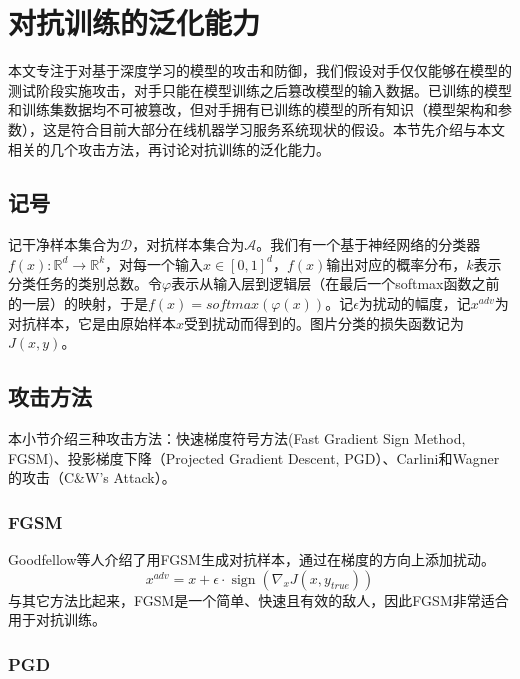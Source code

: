 \chapter{对抗训练的泛化能力}

本文专注于对基于深度学习的模型的攻击和防御，我们假设对手仅仅能够在模型的测试阶段实施攻击，对手只能在模型训练之后篡改模型的输入数据。已训练的模型和训练集数据均不可被篡改，但对手拥有已训练的模型的所有知识（模型架构和参数），这是符合目前大部分在线机器学习服务系统现状的假设。本节先介绍与本文相关的几个攻击方法，再讨论对抗训练的泛化能力。

\section{记号}

记干净样本集合为$\mathcal{D}$，对抗样本集合为$\mathcal{A}$。我们有一个基于神经网络的分类器$f(x) : \mathbb{R}^d \to \mathbb{R}^k$，对每一个输入$x \in [0, 1]^d$，$f(x)$输出对应的概率分布，$k$表示分类任务的类别总数。令$\varphi$表示从输入层到逻辑层（在最后一个softmax函数之前的一层）的映射，于是$f(x) = softmax(\varphi(x))$。记$\epsilon$为扰动的幅度，记$x^{adv}$为对抗样本，它是由原始样本$x$受到扰动而得到的。图片分类的损失函数记为$J(x, y)$。

\section{攻击方法}

本小节介绍三种攻击方法：快速梯度符号方法(Fast Gradient Sign Method, FGSM)\cite{goodfellow2014explaining}、投影梯度下降（Projected Gradient Descent, PGD）\cite{madry2018towards}、Carlini和Wagner的攻击（C\&W's Attack）\cite{carlini2017towards}。

\subsection{FGSM}

Goodfellow等人介绍了用FGSM生成对抗样本，通过在梯度的方向上添加扰动。
\begin{equation}
    x^{a d v}=x+\epsilon \cdot \operatorname{sign}\left(\nabla_{x} J\left(x, y_{t r u e}\right)\right)
\end{equation}
与其它方法比起来，FGSM是一个简单、快速且有效的敌人，因此FGSM非常适合用于对抗训练。

\subsection{PGD}

